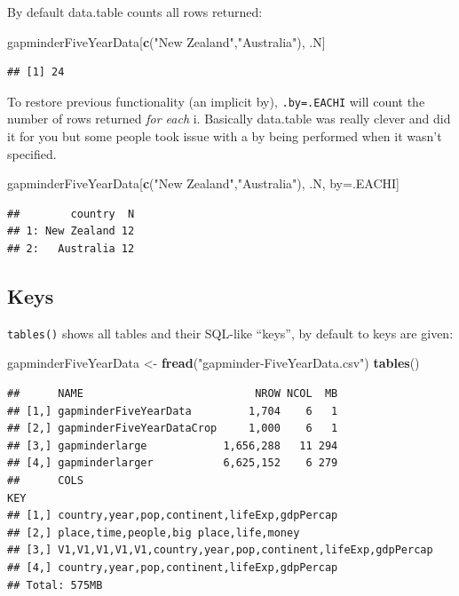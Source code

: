 \documentclass[]{article}
\newenvironment{Shaded}{\begin{snugshade}}{\end{snugshade}}
\newcommand{\KeywordTok}[1]{\textcolor[rgb]{0.13,0.29,0.53}{\textbf{{#1}}}}
\newcommand{\StringTok}[1]{\textcolor[rgb]{0.31,0.60,0.02}{{#1}}}
\newcommand{\NormalTok}[1]{{#1}}
\begin{document}
By default data.table counts all rows returned:

\begin{Shaded}
\begin{Highlighting}[]
\NormalTok{gapminderFiveYearData[}\KeywordTok{c}\NormalTok{(}\StringTok{"New Zealand"}\NormalTok{,}\StringTok{"Australia"}\NormalTok{), .N]}
\end{Highlighting}
\end{Shaded}

\begin{verbatim}
## [1] 24
\end{verbatim}

To restore previous functionality (an implicit by), \texttt{.by=.EACHI}
will count the number of rows returned \emph{for each} i. Basically
data.table was really clever and did it for you but some people took
issue with a by being performed when it wasn't specified.

\begin{Shaded}
\begin{Highlighting}[]
\NormalTok{gapminderFiveYearData[}\KeywordTok{c}\NormalTok{(}\StringTok{"New Zealand"}\NormalTok{,}\StringTok{"Australia"}\NormalTok{), .N, by=.EACHI]}
\end{Highlighting}
\end{Shaded}

\begin{verbatim}
##        country  N
## 1: New Zealand 12
## 2:   Australia 12
\end{verbatim}

\subsection{Keys}\label{keys}

\texttt{tables()} shows all tables and their SQL-like ``keys'', by
default to keys are given:

\begin{Shaded}
\begin{Highlighting}[]
\NormalTok{gapminderFiveYearData <-}\StringTok{ }\KeywordTok{fread}\NormalTok{(}\StringTok{"gapminder-FiveYearData.csv"}\NormalTok{)}
\KeywordTok{tables}\NormalTok{()}
\end{Highlighting}
\end{Shaded}

\begin{verbatim}
##      NAME                           NROW NCOL  MB
## [1,] gapminderFiveYearData         1,704    6   1
## [2,] gapminderFiveYearDataCrop     1,000    6   1
## [3,] gapminderlarge            1,656,288   11 294
## [4,] gapminderlarger           6,625,152    6 279
##      COLS                                                        KEY
## [1,] country,year,pop,continent,lifeExp,gdpPercap                   
## [2,] place,time,people,big place,life,money                         
## [3,] V1,V1,V1,V1,V1,country,year,pop,continent,lifeExp,gdpPercap    
## [4,] country,year,pop,continent,lifeExp,gdpPercap                   
## Total: 575MB
\end{verbatim}
\end{document}
